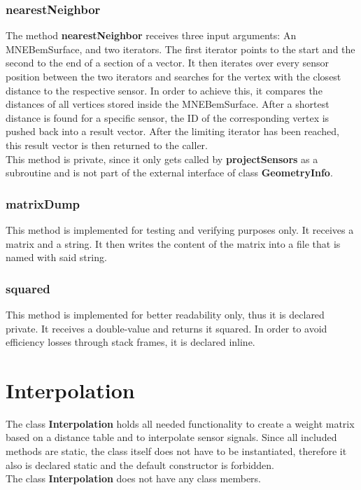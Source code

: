 \clearpage

\subsubsection{nearestNeighbor}
The method \textbf{nearestNeighbor} receives three input arguments: An MNEBemSurface, and two iterators. The first iterator points to the start and the second to the end of a section of a vector.
It then iterates over every sensor position between the two iterators and searches for the vertex with the closest distance to the respective sensor. In order to achieve this, it compares the distances of all vertices stored inside the MNEBemSurface. After a shortest distance is found for a specific sensor, the ID of the corresponding vertex is pushed back into a result vector. After the limiting iterator has been reached, this result vector is then returned to the caller.\\
This method is private, since it only gets called by \textbf{projectSensors} as a subroutine and is not part of the external interface of class \textbf{GeometryInfo}.

\subsubsection{matrixDump}
This method is implemented for testing and verifying purposes only. It receives a matrix and a string. It then writes the content of the matrix into a file that is named with said string.

\subsubsection{squared}
This method is implemented for better readability only, thus it is declared private. It receives a double-value and returns it squared. In order to avoid efficiency losses through stack frames, it is declared inline.

\clearpage


\section{Interpolation}
The class \textbf{Interpolation} holds all needed functionality to create a weight matrix based on a distance table and to interpolate sensor signals. Since all included methods are static, the class itself does not have to be instantiated, therefore it also is declared static and the default constructor is forbidden.\\
The class \textbf{Interpolation} does not have any class members.

